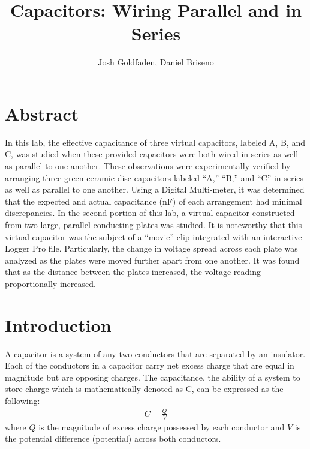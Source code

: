 \documentclass[oneside,12pt]{amsart}
\title{Capacitors: Wiring Parallel and in Series }
\author{Josh Goldfaden, Daniel Briseno}
\date{}
\begin{document}
	\maketitle
	\section{Abstract}
	\indent In this lab, the effective capacitance of three virtual capacitors, labeled A, B, and C, was studied when these provided capacitors were both wired in series as well as parallel to one another. These observations were experimentally verified by arranging three green ceramic disc capacitors labeled “A,” “B,” and “C” in series as well as parallel to one another. Using a Digital Multi-meter, it was determined that the expected and actual capacitance (nF) of each arrangement had minimal discrepancies. In the second portion of this lab, a virtual capacitor constructed from two large, parallel conducting plates was studied. It is noteworthy that this virtual capacitor was the subject of a “movie” clip integrated with an interactive Logger Pro file. Particularly, the change in voltage spread across each plate was analyzed as the plates were moved further apart from one another. It was found that as the distance between the plates increased, the voltage reading proportionally increased. 
	\section{Introduction}
	\indent A capacitor is a system of any two conductors that are separated by an insulator. Each of the conductors in a capacitor carry net excess charge that are equal in magnitude but are opposing charges. The capacitance, the ability of a system to store charge which is mathematically denoted as C, can be expressed as the following: 
	\begin{align*}
		C = \frac{Q}{V}
	\end{align*}
	where $ Q $ is the magnitude of excess charge possessed by each conductor and $V$ is the potential difference (potential) across both conductors.\\
	
\end{document}
